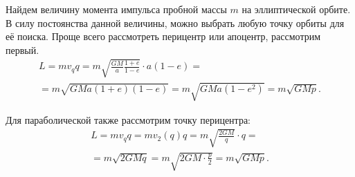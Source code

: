 Найдем величину момента импульса пробной массы $m$ на эллиптической орбите. В силу постоянства данной величины, можно выбрать любую точку орбиты для её поиска. Проще всего рассмотреть перицентр или апоцентр, рассмотрим первый.
\begin{multline*}
	L
	= m v_q q
	= m \sqrt{\frac{GM}{a} \frac{1+e}{1-e}} \cdot a(1-e) =\\
	= m \sqrt{GMa (1 + e)(1-e)}
	= m \sqrt{GMa(1-e^2)}
	= m \sqrt{GMp}.
\end{multline*}

Для параболической также рассмотрим точку перицентра:
\begin{multline*}
	L
	= m v_q q
	= m v_2(q) q
	= m \sqrt{\frac{2GM}{q}} \cdot q =\\
	= m \sqrt{2GMq}
	= m \sqrt{2GM \cdot \frac{p}{2}}
	= m \sqrt{GMp}.
\end{multline*}

